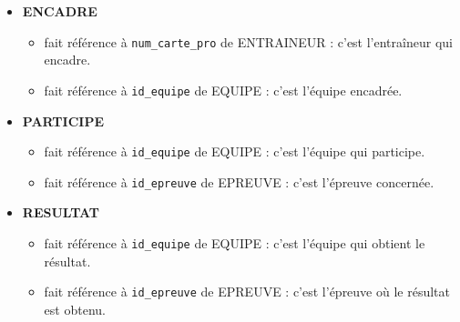\begin{itemize}
  \item \textbf{ENCADRE}
  \begin{itemize}
    \item {} fait référence à \texttt{num\_carte\_pro} de ENTRAINEUR : c'est l'entraîneur qui encadre.
    \item {} fait référence à \texttt{id\_equipe} de EQUIPE : c'est l'équipe encadrée.
  \end{itemize}

  \item \textbf{PARTICIPE}
  \begin{itemize}
    \item {} fait référence à \texttt{id\_equipe} de EQUIPE : c'est l'équipe qui participe.
    \item {} fait référence à \texttt{id\_epreuve} de EPREUVE : c'est l'épreuve concernée.
  \end{itemize}

  \item \textbf{RESULTAT}
  \begin{itemize}
    \item {} fait référence à \texttt{id\_equipe} de EQUIPE : c'est l'équipe qui obtient le résultat.
    \item {} fait référence à \texttt{id\_epreuve} de EPREUVE : c'est l'épreuve où le résultat est obtenu.
  \end{itemize}
\end{itemize}